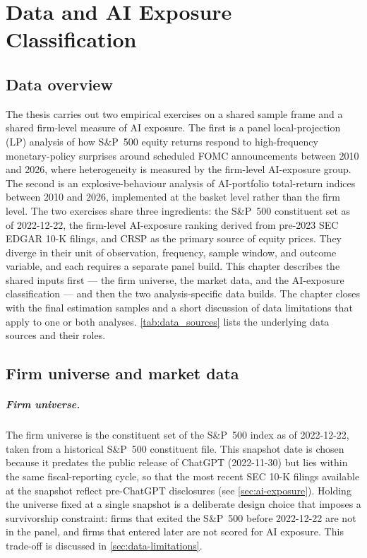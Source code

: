 \chapter{Data and AI Exposure Classification}
\label{ch:data}

\section{Data overview}
\label{sec:data-overview}

The thesis carries out two empirical exercises on a shared sample frame and a shared firm-level measure of AI exposure. The first is a panel local-projection (LP) analysis of how S\&P~500 equity returns respond to high-frequency monetary-policy surprises around scheduled FOMC announcements between 2010 and 2026, where heterogeneity is measured by the firm-level AI-exposure group. The second is an explosive-behaviour analysis of AI-portfolio total-return indices between 2010 and 2026, implemented at the basket level rather than the firm level. The two exercises share three ingredients: the S\&P~500 constituent set as of \mbox{2022-12-22}, the firm-level AI-exposure ranking derived from pre-2023 SEC EDGAR 10-K filings, and CRSP as the primary source of equity prices. They diverge in their unit of observation, frequency, sample window, and outcome variable, and each requires a separate panel build. This chapter describes the shared inputs first --- the firm universe, the market data, and the AI-exposure classification --- and then the two analysis-specific data builds. The chapter closes with the final estimation samples and a short discussion of data limitations that apply to one or both analyses. \cref{tab:data_sources} lists the underlying data sources and their roles.



\section{Firm universe and market data}
\label{sec:firm-universe}

\paragraph{Firm universe.} The firm universe is the constituent set of the S\&P~500 index as of \mbox{2022-12-22}, taken from a historical S\&P~500 constituent file. This snapshot date is chosen because it predates the public release of ChatGPT (\mbox{2022-11-30}) but lies within the same fiscal-reporting cycle, so that the most recent SEC 10-K filings available at the snapshot reflect pre-ChatGPT disclosures (see \cref{sec:ai-exposure}). Holding the universe fixed at a single snapshot is a deliberate design choice that imposes a survivorship constraint: firms that exited the S\&P~500 before \mbox{2022-12-22} are not in the panel, and firms that entered later are not scored for AI exposure. This trade-off is discussed in \cref{sec:data-limitations}.

